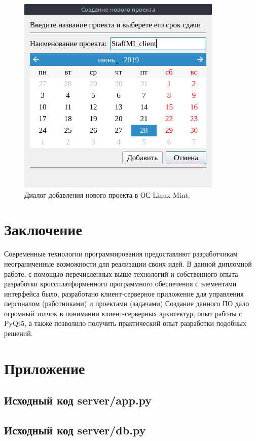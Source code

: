 \begin{figure}[h]
    \centering
    \includegraphics[width=0.5\linewidth]{img/add_project_linux.png}
    \caption{Диалог добавления нового проекта в ОС Linux Mint.}
    \label{fig:add_project_linux}
\end{figure}


\clearpage
\section{Заключение}
Современные технологии программирования предоставляют разработчикам неограниченные возможности для реализации своих идей.
В данной дипломной работе, с помощью перечисленных выше технологий и собственного опыта разработки кроссплатформенного программного обеспечения
с элементами интерфейса было, разработано клиент-серверное приложение для управления персоналом (работниками) и проектами (задачами)
Создание данного ПО дало огромный толчок в понимании клиент-серверных архитектур, опыт работы с PyQt5,
а также позволило получить практический опыт разработки подобных решений.


\clearpage
\section{Приложение}
\subsection{Исходный код server/app.py}



\clearpage
\subsection{Исходный код server/db.py}



% 


